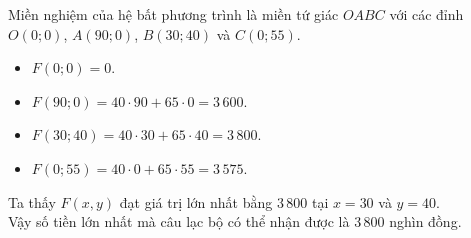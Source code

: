 \begin{ex}
{\begin{center}
		\end{center}
		Miền nghiệm của hệ bất phương trình là miền tứ giác $OABC$ với các đỉnh $O(0;0)$, $A(90;0)$, $B(30;40)$ và $C(0;55)$.
		\begin{itemize}
			\item $F(0; 0) = 0$.
			\item $F(90; 0) = 40 \cdot 90 + 65 \cdot 0 = 3\,600$.
			\item $F(30; 40) = 40 \cdot 30 + 65 \cdot 40 = 3\,800$.
			\item $F(0; 55) = 40 \cdot 0 + 65 \cdot 55 = 3\,575$.
		\end{itemize}
		Ta thấy $F(x, y)$ đạt giá trị lớn nhất bằng $3\,800$ tại $x = 30$ và $y = 40$.\\
		Vậy số tiền lớn nhất mà câu lạc bộ có thể nhận được là $3\,800$ nghìn đồng.
	}
\end{ex}

